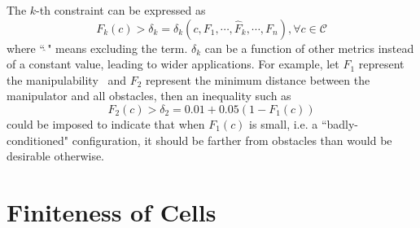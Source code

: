 \documentclass[journal]{IEEEtran}
\begin{document}
\begin{enumerate}
The $k$-th constraint can be expressed as
\begin{equation}\label{equ_strict}
F_k(c) > \delta_k = \delta_k(c, F_1, \cdots, \hat{F}_k, \cdots, F_{n}), \forall c\in \mathscr{C}
\end{equation} 
where ``$\hat{\ }$" means excluding the term. $\delta_k$ can be a function of other metrics instead of a constant value, leading to wider applications. 
For example, let $F_1$ represent the manipulability~\cite{yoshikawa1990translational} 
and $F_2$ represent the minimum distance between the manipulator and all obstacles, then an inequality such as
$$
F_2(c) > \delta_2 = 0.01+0.05(1-F_1(c))
$$
could be imposed to indicate that when $F_1(c)$ is small, i.e. a ``badly-conditioned" configuration, it should be farther from obstacles than would be desirable otherwise. 

\end{enumerate}
\section{Finiteness of Cells}\label{section_finiteness_of_cells}

\end{document}
